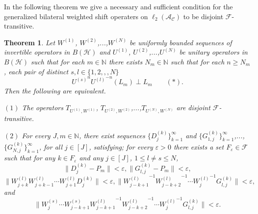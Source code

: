 \documentclass{article}
\newtheorem{theorem}{Theorem}[section]
\begin{document}
In the following theorem we give a necessary and sufficient condition for the generalized bilateral weighted shift operaters on $\ell_{2}(\mathcal{A_{C}})$ to be disjoint $\mathcal{F}$-transitive.
\begin{theorem}\label{the3.1}
Let $W^{(1)}$, $W^{(2)}$,...,$W^{(N)}$ be uniformly bounded sequences of invertible operators in $B(\mathcal{H})$ and $U^{(1)}$, $U^{(2)}$,...,$U^{(N)}$ be unitary operators in $B(\mathcal{H})$ such that for each $m\in \mathbb{N}$ there exists $N_{m}\in\mathbb{N}$ such that for each $n\geq N_{m}$, each pair of distinct $s,l\in \{1,2,,,N\}$
\[{U^{(s)}}^{n}{U^{(l)}}^{-n}(L_{m})\perp L_{m}\textrm{    }\textrm{    }\textrm{    }(\ast).\]
Then the following are equivalent.
	
$(1)$ The operators $T_{U^{(1)},W^{(1)}}$, $T_{U^{(2)},W^{(2)}}$,...,$T_{U^{(N)},W^{(N)}}$ are disjoint $\mathcal{F}$-transitive.
	
$(2)$ For every $J,m \in\mathbb{N}$, there exist sequences
$\{D^{(k)}_{j}\}^{\infty}_{k=1}$ and $\{G^{(k)}_{1,j}\}^{\infty}_{k=1}$,...,$\{G^{(k)}_{N,j}\}^{\infty}_{k=1}$, for all $j\in [J]$, satisfying;
for every $\varepsilon>0$ there exists a set $F_{\varepsilon}\in\mathcal{F}$ such that for any $k\in F_{\varepsilon}$ and any $j\in [J]$, $1\leq l\neq s \leq N$,
\[\|D^{(k)}_{j}-P_{m}\|<\varepsilon, \|G^{(k)}_{l,j}-P_{m}\|<\varepsilon,\]
\[\|W^{(l)}_{j+k}W^{(l)}_{j+k-1}\cdots W^{(l)}_{j+1}D^{(k)}_{j}\|<\varepsilon,
\|{W^{(l)}_{j-k+1}}^{-1}{W^{(l)}_{j-k+2}}^{-1}\cdots{W^{(l)}_{j}}^{-1}G^{(k)}_{l,j}\|<\varepsilon,\]
and
\[\|W^{(s)}_{j}\cdots W^{(s)}_{j-k+1}{W^{(l)}_{j-k+1}}^{-1}{W^{(l)}_{j-k+2}}^{-1}\cdots {W^{(l)}_{j}}^{-1}G^{(k)}_{l,j}\| <\varepsilon.\]
\end{theorem}
\end{document}
